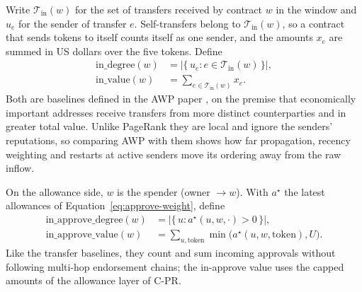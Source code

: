 Write $\mathcal{T}_{\mathrm{in}}(w)$ for the set of transfers received by contract $w$ in the window and $u_e$ for the sender of transfer $e$. Self-transfers belong to $\mathcal{T}_{\mathrm{in}}(w)$, so a contract that sends tokens to itself counts itself as one sender, and the amounts $x_e$ are summed in US dollars over the five tokens. Define
\begin{align}
\mathrm{in\_degree}(w)
&=
\bigl|\{\,u_e : e\in\mathcal{T}_{\mathrm{in}}(w)\,\}\bigr|,
\label{eq:in-degree}\\
\mathrm{in\_value}(w)
&=
\sum_{e\in\mathcal{T}_{\mathrm{in}}(w)} x_e.
\label{eq:in-value}
\end{align}
Both are baselines defined in the AWP paper \parencite{do2023awp}, on the premise that economically important addresses receive transfers from more distinct counterparties and in greater total value. Unlike PageRank they are local and ignore the senders' reputations, so comparing AWP with them shows how far propagation, recency weighting and restarts at active senders move its ordering away from the raw inflow.


On the allowance side, $w$ is the spender (owner $\to w$). With $a^{\star}$ the latest allowances of Equation~\eqref{eq:approve-weight}, define
\begin{align}
\mathrm{in\_approve\_degree}(w)
&=
\bigl|\{\,u : a^{\star}(u,w,\cdot)>0\,\}\bigr|,
\label{eq:in-approve-degree}\\
\mathrm{in\_approve\_value}(w)
&=
\sum_{u,\mathrm{token}} \min\bigl(a^{\star}(u,w,\mathrm{token}),U\bigr).
\label{eq:in-approve-value}
\end{align}
Like the transfer baselines, they count and sum incoming approvals without following multi-hop endorsement chains; the in-approve value uses the capped amounts of the allowance layer of C-PR.


